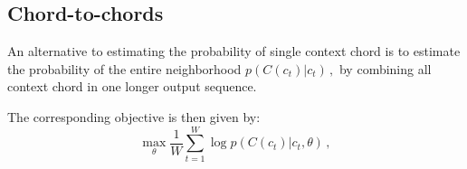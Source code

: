 \documentclass[12pt]{article}\pagestyle{myheadings}
\begin{document}
\subsection{Chord-to-chords}
An alternative to estimating the probability of  single context chord is to estimate the probability of the entire neighborhood 
$
p(C(c_t) | c_t)\,,
$
by combining all context chord in one longer output sequence. 

The corresponding objective is then given by:
\begin{equation}
\max_{\theta}  \frac{1}{W} \sum_{t=1}^{W} \log p(C(c_t)|c_t,\theta)\,,
\label{eq:objective}
\end{equation}


\newpage

 
\end{document}
